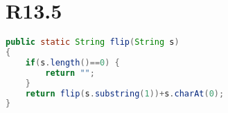 \documentclass{article}
\begin{document}
\section{R13.5}
\begin{lstlisting}[language=Java]
public static String flip(String s)
{
    if(s.length()==0) {
        return "";
    }
    return flip(s.substring(1))+s.charAt(0);
}
\end{lstlisting}
\end{document}
